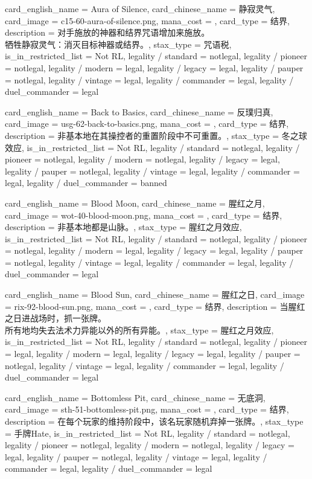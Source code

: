\documentclass[lang = cn, color = black, 10pt]{AllThatStax}
\begin{document}
\card
{
	card_english_name = {Aura of Silence},
	card_chinese_name = {静寂灵气},
	card_image = c15-60-aura-of-silence.png,
	mana_cost = ,
	card_type = 结界,
	description = {对手施放的神器和结界咒语增加来施放。\\
牺牲静寂灵气：消灭目标神器或结界。},
	stax_type = 咒语税,
	is_in_restricted_list = Not RL,
	legality / standard = notlegal,
	legality / pioneer = notlegal,
	legality / modern = legal,
	legality / legacy = legal,
	legality / pauper = notlegal,
	legality / vintage = legal,
	legality / commander = legal,
	legality / duel_commander = legal
}

\card
{
	card_english_name = {Back to Basics},
	card_chinese_name = {反璞归真},
	card_image = usg-62-back-to-basics.png,
	mana_cost = ,
	card_type = 结界,
	description = {非基本地在其操控者的重置阶段中不可重置。},
	stax_type = 冬之球效应,
	is_in_restricted_list = Not RL,
	legality / standard = notlegal,
	legality / pioneer = notlegal,
	legality / modern = notlegal,
	legality / legacy = legal,
	legality / pauper = notlegal,
	legality / vintage = legal,
	legality / commander = legal,
	legality / duel_commander = banned
}

\card
{
	card_english_name = {Blood Moon},
	card_chinese_name = {腥红之月},
	card_image = wot-40-blood-moon.png,
	mana_cost = ,
	card_type = 结界,
	description = {非基本地都是山脉。},
	stax_type = 腥红之月效应,
	is_in_restricted_list = Not RL,
	legality / standard = notlegal,
	legality / pioneer = notlegal,
	legality / modern = legal,
	legality / legacy = legal,
	legality / pauper = notlegal,
	legality / vintage = legal,
	legality / commander = legal,
	legality / duel_commander = legal
}

\card
{
	card_english_name = {Blood Sun},
	card_chinese_name = {腥红之日},
	card_image = rix-92-blood-sun.png,
	mana_cost = ,
	card_type = 结界,
	description = {当腥红之日进战场时，抓一张牌。\\
所有地均失去法术力异能以外的所有异能。},
	stax_type = 腥红之月效应,
	is_in_restricted_list = Not RL,
	legality / standard = notlegal,
	legality / pioneer = legal,
	legality / modern = legal,
	legality / legacy = legal,
	legality / pauper = notlegal,
	legality / vintage = legal,
	legality / commander = legal,
	legality / duel_commander = legal
}

\card
{
	card_english_name = {Bottomless Pit},
	card_chinese_name = {无底洞},
	card_image = sth-51-bottomless-pit.png,
	mana_cost = ,
	card_type = 结界,
	description = {在每个玩家的维持阶段中，该名玩家随机弃掉一张牌。},
	stax_type = 手牌Hate,
	is_in_restricted_list = Not RL,
	legality / standard = notlegal,
	legality / pioneer = notlegal,
	legality / modern = notlegal,
	legality / legacy = legal,
	legality / pauper = notlegal,
	legality / vintage = legal,
	legality / commander = legal,
	legality / duel_commander = legal
}
\end{document}
